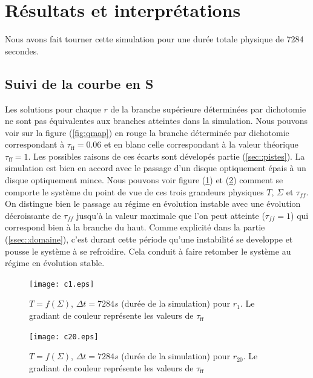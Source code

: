 \section{Résultats et interprétations}

Nous avons fait tourner cette simulation pour une durée totale physique de 7284 secondes.

\subsection{Suivi de la courbe en S}
Les solutions pour chaque $r$ de la branche supérieure déterminées par dichotomie ne sont pas équivalentes aux branches atteintes dans la simulation. Nous pouvons voir sur la figure (\ref{fig:qmap}) en rouge la branche déterminée par dichotomie correspondant à $\tau_\mathrm{ff} = 0.06 $ et en blanc celle correspondant à la valeur théorique $\tau_\mathrm{ff} = 1$. Les possibles raisons de ces écarts sont dévelopés partie (\ref{sec::pistes}). La simulation est bien en accord avec le passage d'un disque optiquement épais à un disque optiquement mince. Nous pouvons voir figure (\ref{fig:c1.eps}) et (\ref{fig:c20.eps}) comment se comporte le système du point de vue de ces trois grandeurs physiques $T$, $\Sigma$ et $\tau_{ff}$. On distingue bien le passage au régime en évolution instable avec une évolution décroissante de $\tau_{ff}$ jusqu'à la valeur maximale que l'on peut atteinte ($\tau_{ff} = 1$) qui correspond bien à la branche du haut. Comme explicité dans la partie (\ref{ssec::domaine}), c'est durant cette période qu'une instabilité se developpe et pousse le système à se refroidire. Cela conduit à faire retomber le système au régime en évolution stable. \\
 

\begin{figure}
  \begin{center}
    \texttt{[image: c1.eps]}
  \end{center}
  \caption{$T=f(\Sigma)$, $\Delta t = 7284 s$ (durée de la simulation) pour $r_{1}$. Le gradiant de couleur représente les valeurs de $\tau_\mathrm{ff}$}
  \label{fig:c1.eps}
\end{figure} 

\begin{figure}
  \begin{center}
    \texttt{[image: c20.eps]}
  \end{center}
  \caption{$T=f(\Sigma)$, $\Delta t = 7284 s$ (durée de la simulation) pour $r_{20}$. Le gradiant de couleur représente les valeurs de $\tau_\mathrm{ff}$}
  \label{fig:c20.eps}
\end{figure}

